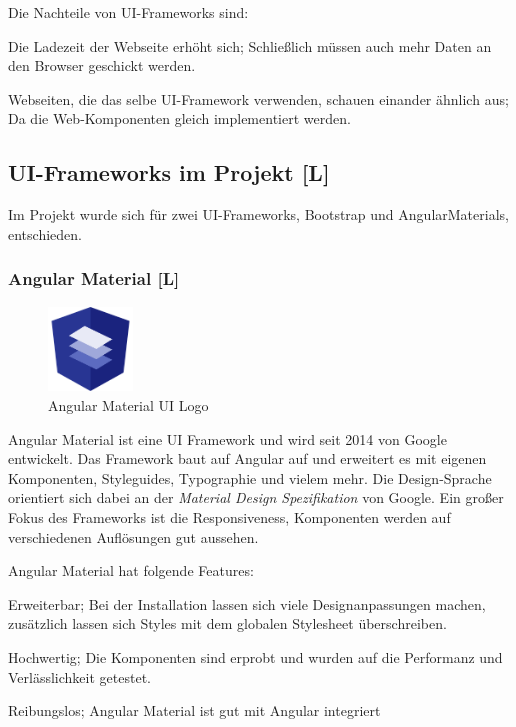 Die Nachteile von UI-Frameworks sind: \cite{CssFrameworkExplaination, BestCSSFrameworksin2022}
\begin{compactitem}
    \item Die Ladezeit der Webseite erhöht sich;
    Schließlich müssen auch mehr Daten an den Browser geschickt werden.
    \item Webseiten, die das selbe UI-Framework verwenden, schauen einander ähnlich aus;
    Da die Web-Komponenten gleich implementiert werden.
\end{compactitem}


\subsection{UI-Frameworks im Projekt [L]}
Im Projekt wurde sich für zwei UI-Frameworks, Bootstrap und AngularMaterials, entschieden.


\subsubsection{Angular Material [L]}
\begin{figure}
  \begin{center}
    \includegraphics[width=0.2\textwidth]{pics/Angular_Material_UI_Logo.png}
   \caption{Angular Material UI Logo}
  \end{center}
\end{figure}
Angular Material ist eine UI Framework und wird seit 2014 von Google entwickelt. Das Framework baut auf Angular auf und erweitert es mit eigenen Komponenten, Styleguides, Typographie und vielem mehr. Die Design-Sprache orientiert sich dabei an der \emph{Material Design Spezifikation} von Google. Ein großer Fokus des Frameworks ist die Responsiveness, Komponenten werden auf verschiedenen Auflösungen gut aussehen. \cite{JavaPointAngularMaterial, WhatAngularMaterial}


Angular Material hat folgende Features: \cite{JavaPointAngularMaterial, WhatAngularMaterial}
\begin{compactitem}
    \item Erweiterbar; Bei der Installation lassen sich viele Designanpassungen machen, zusätzlich lassen sich Styles mit dem globalen Stylesheet überschreiben. 
    \item Hochwertig; Die Komponenten sind erprobt und wurden auf die Performanz und Verlässlichkeit getestet.
    \item Reibungslos; Angular Material ist gut mit Angular integriert
\end{compactitem}

